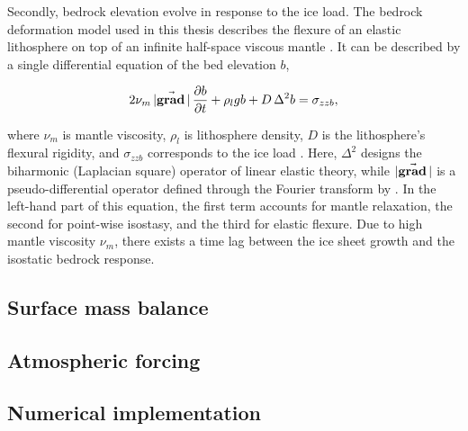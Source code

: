 \documentclass{article}
\newcommand{\vect}[1]{\va*{#1}} %
\renewcommand{\grad}[1]{\vect{\mathrm{grad}}\,#1}   %
\begin{document}
Secondly, bedrock elevation evolve in response to the ice load. The bedrock
deformation model used in this thesis describes the flexure of an elastic
lithosphere on top of an infinite half-space viscous mantle
\citep{Lingle.Clark.1985}. It can be described by a single differential
equation of the bed elevation $b$,

\begin{equation}
    2\nu_m\,|\grad|\,\pdv{b}{t} + \rho_l g b + D\,\Delta^2 b = \sigma_{zzb},
\end{equation}

where $\nu_m$ is mantle viscosity, $\rho_l$ is lithosphere density, $D$ is the
lithosphere's flexural rigidity, and $\sigma_{zzb}$ corresponds to the ice load
\citep{Bueler.etal.2007}. Here, $\Delta^2$ designs the biharmonic (Laplacian
square) operator of
linear elastic theory, while $|\grad|$ is a pseudo-differential operator
defined through the Fourier transform by \citet[Eqn.~6]{Bueler.etal.2007}. In
the left-hand part of this equation, the first term accounts for mantle
relaxation, the second for point-wise isostasy, and the third for elastic
flexure. Due to high mantle viscosity $\nu_m$, there exists a time lag between
the ice sheet growth and the isostatic bedrock response.

\subsection{Surface mass balance}

\subsection{Atmospheric forcing}

\subsection{Numerical implementation}




\end{document}
